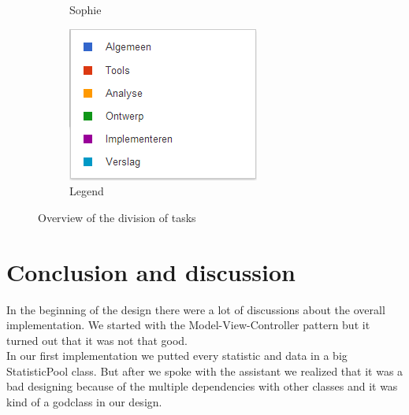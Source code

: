 \documentclass[i2]{oss}
\begin{document}
\begin{figure}[h!]
\begin{subfigure}[hb]{0.20\textwidth}
                \caption{Sophie}
        \end{subfigure}%
                \begin{subfigure}[hb]{0.20\textwidth}
                \centering
                \includegraphics[width=\textwidth]{legende}
                \caption{Legend}
        \end{subfigure}%


 \caption{Overview of the division of tasks}
\label{fig:werkverdeling}
\end{figure}





\section{Conclusion and discussion}
\label{ssec:conclusion}



In the beginning of the design there were a lot of discussions about the overall implementation. We started with the Model-View-Controller pattern but it turned out that it was not that good. \\

In our first implementation we putted every statistic and data in a big StatisticPool class. But after we spoke with the assistant we realized that it was a bad designing because of the multiple dependencies with other classes and it was kind of a godclass in our design. \\
\end{document}
